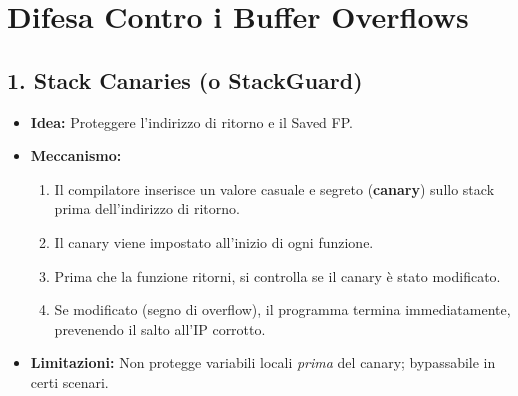 \documentclass{article}
\begin{document}
\newpage
\section{Difesa Contro i Buffer Overflows}

\subsection{1. Stack Canaries (o StackGuard)}
\begin{itemize}
    \item \textbf{Idea:} Proteggere l'indirizzo di ritorno e il Saved FP.
    \item \textbf{Meccanismo:}
        \begin{enumerate}
            \item Il compilatore inserisce un valore casuale e segreto (\textbf{canary}) sullo stack prima dell'indirizzo di ritorno.
            \item Il canary viene impostato all'inizio di ogni funzione.
            \item Prima che la funzione ritorni, si controlla se il canary è stato modificato.
            \item Se modificato (segno di overflow), il programma termina immediatamente, prevenendo il salto all'IP corrotto.
        \end{enumerate}
    \item \textbf{Limitazioni:} Non protegge variabili locali \textit{prima} del canary; bypassabile in certi scenari.
\end{itemize}
\end{document}
